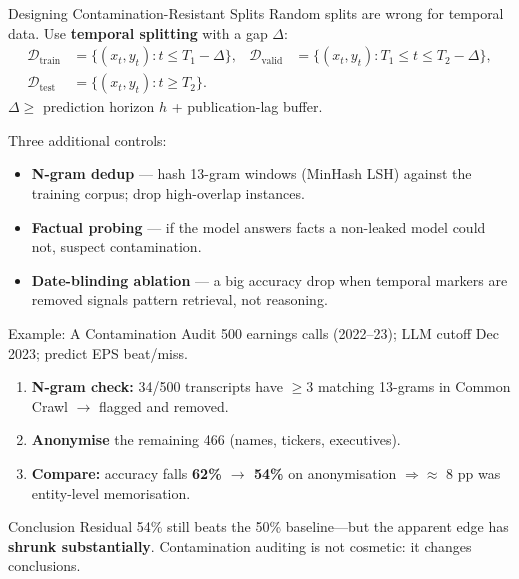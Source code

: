 \documentclass[9pt,t]{beamer}
\begin{document}
\begin{frame}{Designing Contamination-Resistant Splits}
Random splits are wrong for temporal data. Use \textbf{temporal splitting} with
a gap $\Delta$:
\begin{align*}
  \mathcal{D}_{\text{train}} &= \{(x_t,y_t): t \leq T_1 - \Delta\}, &
  \mathcal{D}_{\text{valid}} &= \{(x_t,y_t): T_1 \leq t \leq T_2 - \Delta\}, \\
  \mathcal{D}_{\text{test}}  &= \{(x_t,y_t): t \geq T_2\}.
\end{align*}
$\Delta \geq$ prediction horizon $h$ + publication-lag buffer.

\medskip
\begin{underhood}
Three additional controls:
\begin{itemize}
  \item \textbf{N-gram dedup} --- hash 13-gram windows (MinHash LSH) against the
        training corpus; drop high-overlap instances.
  \item \textbf{Factual probing} --- if the model answers facts a non-leaked
        model could not, suspect contamination.
  \item \textbf{Date-blinding ablation} --- a big accuracy drop when temporal
        markers are removed signals pattern retrieval, not reasoning.
\end{itemize}
\end{underhood}
\end{frame}

\begin{frame}{Example: A Contamination Audit}
500 earnings calls (2022--23); LLM cutoff Dec 2023; predict EPS beat/miss.

\medskip
\begin{enumerate}
  \item \textbf{N-gram check:} 34/500 transcripts have $\geq 3$ matching
        13-grams in Common Crawl $\to$ flagged and removed.
  \item \textbf{Anonymise} the remaining 466 (names, tickers, executives).
  \item \textbf{Compare:} accuracy falls \textbf{62\% $\to$ 54\%} on
        anonymisation $\Rightarrow \approx$ 8 pp was entity-level memorisation.
\end{enumerate}

\medskip
\begin{alertblock}{Conclusion}
Residual 54\% still beats the 50\% baseline---but the apparent edge has
\textbf{shrunk substantially}. Contamination auditing is not cosmetic: it
changes conclusions.
\end{alertblock}
\end{frame}
\end{document}
